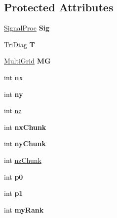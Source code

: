 \subsection*{Protected Attributes}
\begin{DoxyCompactItemize}
\item 
\mbox{\label{classPencilDcmp_af27d1d1ecb8ca3f1ba1f5358a151bfa8}} 
\mbox{\hyperlink{classSignalProc}{Signal\+Proc}} {\bfseries Sig}
\item 
\mbox{\label{classPencilDcmp_a09f052dc6ca5fa44b9903decdbd94643}} 
\mbox{\hyperlink{classTriDiag}{Tri\+Diag}} {\bfseries T}
\item 
\mbox{\label{classPencilDcmp_a2af367390792d724bb236c221dfca09b}} 
\mbox{\hyperlink{classMultiGrid}{Multi\+Grid}} {\bfseries MG}
\item 
\mbox{\label{classPencilDcmp_a704f4833c6924ad793571b49368d324d}} 
int {\bfseries nx}
\item 
\mbox{\label{classPencilDcmp_a0127b72085e393b9cb7ce93e0bd305aa}} 
int {\bfseries ny}
\item 
int \mbox{\hyperlink{classPencilDcmp_aedb528abdba6fa4a541af83f851e11c8}{nz}}
\item 
\mbox{\label{classPencilDcmp_af9832befb38f93a3362fded8d2bed49f}} 
int {\bfseries nx\+Chunk}
\item 
\mbox{\label{classPencilDcmp_a972ecab11f0e9e690397bf146ff3f541}} 
int {\bfseries ny\+Chunk}
\item 
int \mbox{\hyperlink{classPencilDcmp_af606d599e42ca97ed639e4b4a633e691}{nz\+Chunk}}
\item 
\mbox{\label{classPencilDcmp_a07f216cb52f0e1d6abda590a891d8790}} 
int {\bfseries p0}
\item 
\mbox{\label{classPencilDcmp_a6d30295337c553ee27f8b31ef412d881}} 
int {\bfseries p1}
\item 
\mbox{\label{classPencilDcmp_a93f5d6c46148396e24879b9faae8c257}} 
int {\bfseries my\+Rank}

\end{DoxyCompactItemize}
